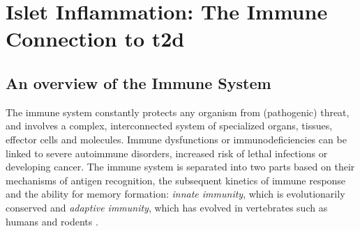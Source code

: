 



\section[Islet Inflammation: The Immune Connection to \glsentryshort{t2d}]{Islet Inflammation: 
The Immune Connection to \gls{t2d}}  %
\label{sec:int_inflammation}



\subsection{An overview of the Immune System}

\par The immune system constantly protects any organism from (pathogenic) threat, and involves a complex, interconnected system of specialized organs, tissues, effector cells and molecules. Immune dysfunctions or immunodeficiencies can be linked to severe autoimmune disorders, increased risk of lethal infections or developing cancer. The immune system is separated into two parts based on their mechanisms of antigen recognition, the subsequent kinetics of immune response and the ability for memory formation: \textit{innate immunity}, which is evolutionarily conserved and \textit{adaptive immunity}, which has evolved in vertebrates such as humans and rodents \textbf{\cite{orange_natural_2013,murphy_janeways_2017}}.\\

